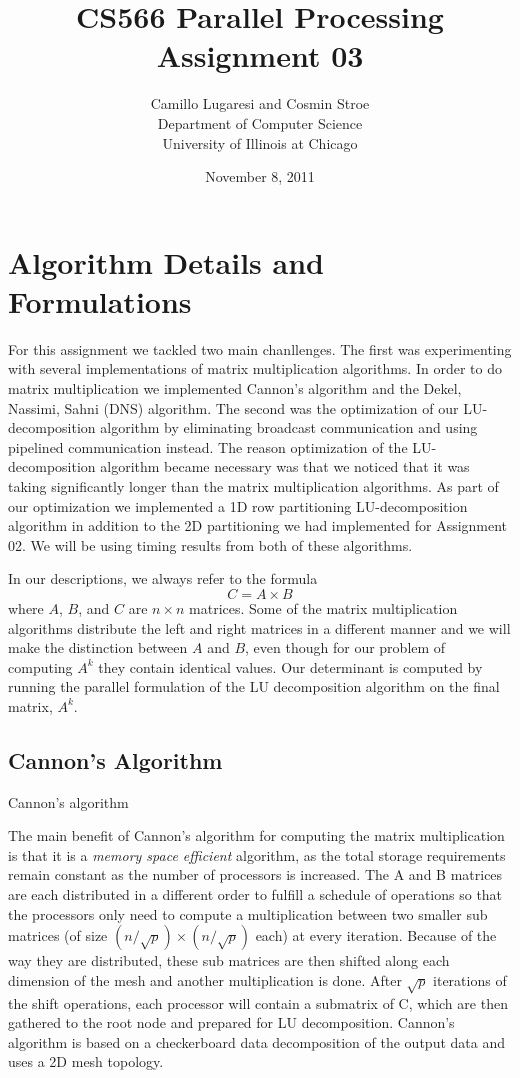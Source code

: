 \documentclass{article}
\title{CS566 Parallel Processing \\ Assignment 03}
\author{Camillo Lugaresi and Cosmin Stroe \vspace{20pt} \\ Department of Computer Science \\
University of Illinois at Chicago}
\date{November 8, 2011}
\begin{document}
\maketitle
\newpage

\section{Algorithm Details and Formulations}

For this assignment we tackled two main chanllenges.  The first was
experimenting with several implementations of matrix multiplication algorithms. 
In order to do matrix multiplication we implemented Cannon's algorithm and the
Dekel, Nassimi, Sahni (DNS) algorithm.  The second was the optimization of our
LU-decomposition algorithm by eliminating broadcast communication and using
pipelined communication instead.  The reason optimization of the
LU-decomposition algorithm became necessary was that we noticed that it was
taking significantly longer than the matrix multiplication algorithms.  As part
of our optimization we implemented a 1D row partitioning LU-decomposition
algorithm in addition to the 2D partitioning we had implemented for
Assignment 02.  We will be using timing results from both of these algorithms.

In our descriptions, we always refer to the formula $$C = A \times B$$ where
$A$, $B$, and $C$ are $n \times n$ matrices.  Some of the matrix multiplication
algorithms distribute the left and right matrices in a different manner and we
will make the distinction between $A$ and $B$, even though for our problem of
computing $A^k$ they contain identical values.  Our determinant is computed by
running the parallel formulation of the LU decomposition algorithm on the final
matrix, $A^k$.



\subsection{Cannon's Algorithm}

Cannon's algorithm 

The main benefit of Cannon's algorithm for computing the matrix multiplication
is that it is a \textit{memory space efficient} algorithm, as the total storage
requirements remain constant as the number of processors is
increased.  The A and B matrices are each distributed in a different order to
fulfill a schedule of operations so that the processors only need to compute a multiplication
between two smaller sub matrices (of size $(n/\sqrt{p})\times(n/\sqrt{p})$ each) at every iteration.  
Because of the way they are distributed, these sub matrices are then shifted
along each dimension of the mesh and another multiplication is done. After
$\sqrt{p}$ iterations of the shift operations, each processor will contain a
submatrix of C, which are then gathered to the root node and prepared for LU
decomposition.  Cannon's algorithm is based on a checkerboard data
decomposition of the output data and uses a 2D mesh topology.
\end{document}
